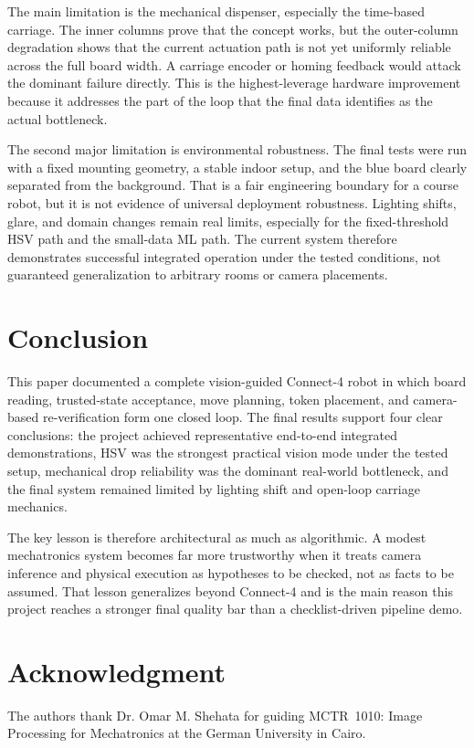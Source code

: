 \documentclass[conference]{IEEEtran}
\begin{document}
The main limitation is the mechanical dispenser, especially the time-based carriage. The inner columns prove that the concept works, but the outer-column degradation shows that the current actuation path is not yet uniformly reliable across the full board width. A carriage encoder or homing feedback would attack the dominant failure directly. This is the highest-leverage hardware improvement because it addresses the part of the loop that the final data identifies as the actual bottleneck.

The second major limitation is environmental robustness. The final tests were run with a fixed mounting geometry, a stable indoor setup, and the blue board clearly separated from the background. That is a fair engineering boundary for a course robot, but it is not evidence of universal deployment robustness. Lighting shifts, glare, and domain changes remain real limits, especially for the fixed-threshold HSV path and the small-data ML path. The current system therefore demonstrates successful integrated operation under the tested conditions, not guaranteed generalization to arbitrary rooms or camera placements.

\section{Conclusion}
This paper documented a complete vision-guided Connect-4 robot in which board reading, trusted-state acceptance, move planning, token placement, and camera-based re-verification form one closed loop. The final results support four clear conclusions: the project achieved representative end-to-end integrated demonstrations, HSV was the strongest practical vision mode under the tested setup, mechanical drop reliability was the dominant real-world bottleneck, and the final system remained limited by lighting shift and open-loop carriage mechanics.

The key lesson is therefore architectural as much as algorithmic. A modest mechatronics system becomes far more trustworthy when it treats camera inference and physical execution as hypotheses to be checked, not as facts to be assumed. That lesson generalizes beyond Connect-4 and is the main reason this project reaches a stronger final quality bar than a checklist-driven pipeline demo.

\section*{Acknowledgment}
The authors thank Dr. Omar M. Shehata for guiding MCTR~1010: Image Processing for Mechatronics at the German University in Cairo.



\end{document}
